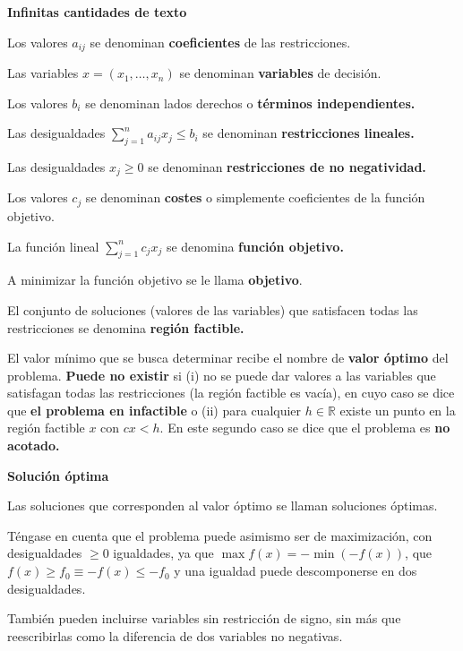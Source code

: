 \documentclass[openany]{book}
\begin{document}
\begin{definition}
  { \color{turquoise} \textbf{Infinitas cantidades de texto}}


  Los valores $a_{i j}$ se denominan \textbf{coeficientes} de las restricciones.

  Las variables $x=\left(x_{1}, \ldots, x_{n}\right)$ se denominan \textbf{variables} de decisión.

  Los valores $b_{i}$ se denominan lados derechos o \textbf{términos independientes.}

  Las desigualdades $\sum_{j=1}^{n} a_{i j} x_{j} \leq b_{i}$ se denominan \textbf{restricciones lineales.}

  Las desigualdades $x_{j} \geq 0$ se denominan \textbf{restricciones de no negatividad.}

  Los valores $c_{j}$ se denominan \textbf{costes} o simplemente coeficientes de la función objetivo.

  La función lineal $\sum_{j=1}^{n} c_{j} x_{j}$ se denomina \textbf{función objetivo.}

  A minimizar la función objetivo se le llama \textbf{objetivo}.

  El conjunto de soluciones (valores de las variables) que satisfacen todas las restricciones se denomina \textbf{región factible.}
\end{definition}


El valor mínimo que se busca determinar recibe el nombre de \textbf{valor óptimo} del problema. \textbf{Puede no existir} si (i) no se puede dar valores a las variables que satisfagan todas las restricciones (la región factible es vacía), en cuyo caso se dice que \textbf{el problema en infactible} o (ii) para cualquier $h \in \mathbb{R}$ existe un punto en la región factible $x$ con $c x<h$. En este segundo caso se dice que el problema es \textbf{no acotado.}

\begin{definition}
  { \color{turquoise} \textbf{Solución óptima}}

  Las soluciones que corresponden al valor óptimo se llaman soluciones óptimas.
\end{definition}

Téngase en cuenta que el problema puede asimismo ser de maximización, con desigualdades $\geq 0$ igualdades, ya que $\max f(x)=-\min (-f(x))$, que $f(x) \geq f_{0} \equiv-f(x) \leq-f_{0}$ y una igualdad puede descomponerse en dos desigualdades.

También pueden incluirse variables sin restricción de signo, sin más que reescribirlas como la diferencia de dos variables no negativas.
\end{document}
